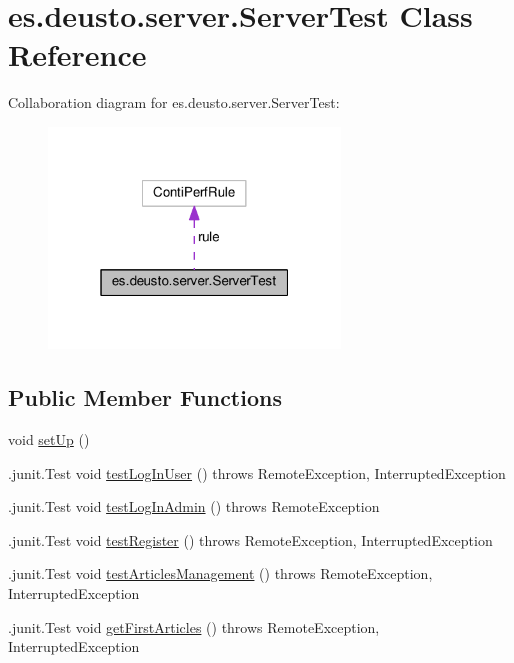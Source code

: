 \hypertarget{classes_1_1deusto_1_1server_1_1_server_test}{}\section{es.\+deusto.\+server.\+Server\+Test Class Reference}
\label{classes_1_1deusto_1_1server_1_1_server_test}


Collaboration diagram for es.\+deusto.\+server.\+Server\+Test\+:
\nopagebreak
\begin{figure}[H]
\begin{center}
\leavevmode
\includegraphics[width=220pt]{classes_1_1deusto_1_1server_1_1_server_test__coll__graph}
\end{center}
\end{figure}
\subsection*{Public Member Functions}
\begin{DoxyCompactItemize}
\item 
void \hyperlink{classes_1_1deusto_1_1server_1_1_server_test_af715b0b972d52aaa4d90bf086f990921}{set\+Up} ()
\item 
.junit.\+Test void \hyperlink{classes_1_1deusto_1_1server_1_1_server_test_a7c2dd5cf5eb68dbf35b10f6c29b6734f}{test\+Log\+In\+User} ()  throws Remote\+Exception, Interrupted\+Exception 
\item 
.junit.\+Test void \hyperlink{classes_1_1deusto_1_1server_1_1_server_test_ade2896be992e43bbfb29ba455da9d335}{test\+Log\+In\+Admin} ()  throws Remote\+Exception 
\item 
.junit.\+Test void \hyperlink{classes_1_1deusto_1_1server_1_1_server_test_adb4299be45a2652280186729967b6f78}{test\+Register} ()  throws Remote\+Exception, Interrupted\+Exception 
\item 
.junit.\+Test void \hyperlink{classes_1_1deusto_1_1server_1_1_server_test_ae9706506ea1913688180ef68f900c73a}{test\+Articles\+Management} ()  throws Remote\+Exception, Interrupted\+Exception 
\item 
.junit.\+Test void \hyperlink{classes_1_1deusto_1_1server_1_1_server_test_a3e97ef887212fc0047e556559d9677ba}{get\+First\+Articles} ()  throws Remote\+Exception, Interrupted\+Exception 
\end{DoxyCompactItemize}
